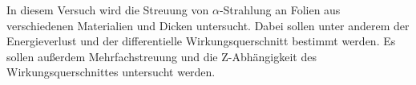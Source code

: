 In diesem Versuch wird die Streuung von $\alpha$-Strahlung an Folien aus verschiedenen Materialien und Dicken untersucht.
Dabei sollen unter anderem der Energieverlust und der differentielle Wirkungsquerschnitt bestimmt werden.
Es sollen außerdem Mehrfachstreuung und die Z-Abhängigkeit des Wirkungsquerschnittes untersucht werden.
